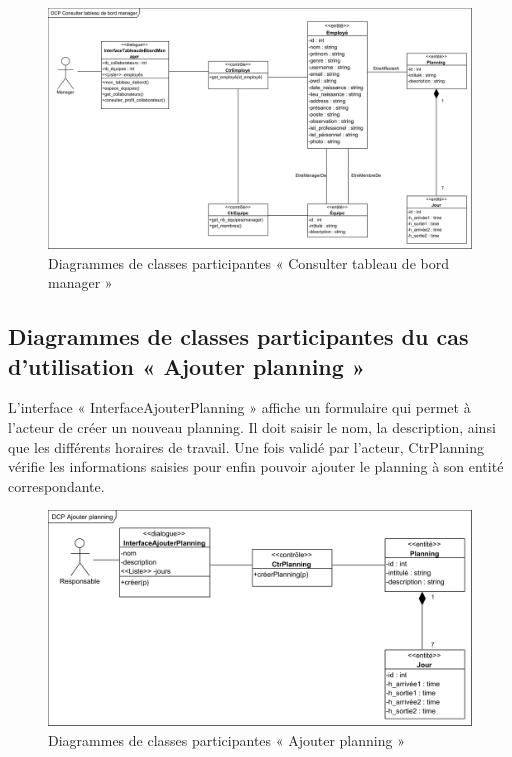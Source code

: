\begin{figure}[h!]
    \centering
    \includegraphics[scale=0.68,angle=90]{images/DCP/DCP Consulter tableau de bord manager.png}
    \caption{Diagrammes de classes participantes « Consulter tableau de bord manager »}
    \label{fig27}
    \end{figure}

\clearpage
       
\subsection*{Diagrammes de classes participantes du cas d'utilisation « Ajouter planning »}
L’interface « InterfaceAjouterPlanning » affiche un formulaire qui permet à
l’acteur de créer un nouveau planning. Il doit saisir le nom, la description,
ainsi que les différents horaires de travail. Une fois validé par l’acteur,
CtrPlanning vérifie les informations saisies pour enfin pouvoir ajouter le
planning à son entité correspondante.
           
\begin{figure}[h!]
    \centering
    \includegraphics[scale=0.88]{images/DCP/DCP Ajouter planning.png}
    \caption{Diagrammes de classes participantes « Ajouter planning »}
    \label{fig28}
\end{figure}
        
